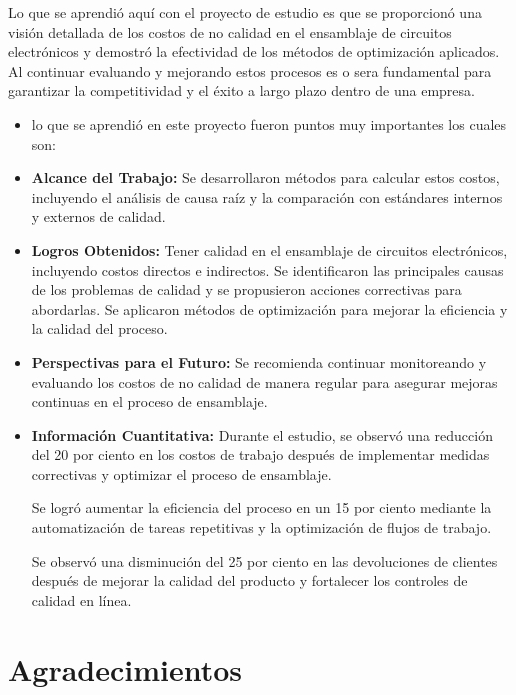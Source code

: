     Lo que se aprendió aquí con el proyecto de estudio es que se proporcionó una visión detallada de los costos de no calidad en el ensamblaje de circuitos electrónicos y demostró la efectividad de los métodos de optimización aplicados. Al continuar evaluando y mejorando estos procesos es o sera fundamental para garantizar la competitividad y el éxito a largo plazo dentro de una empresa.
    \begin{itemize}
    \item lo que se aprendió en este proyecto fueron puntos muy importantes los cuales son:
    
    \item \textbf{Alcance del Trabajo:}
    Se desarrollaron métodos para calcular estos costos, incluyendo el análisis de causa raíz y la comparación con estándares internos y externos de calidad.
    
    \item \textbf{Logros Obtenidos:} 
    Tener calidad en el ensamblaje de circuitos electrónicos, incluyendo costos directos e indirectos.
    Se identificaron las principales causas de los problemas de calidad y se propusieron acciones correctivas para abordarlas.
    Se aplicaron métodos de optimización para mejorar la eficiencia y la calidad del proceso.
    
    \item \textbf{Perspectivas para el Futuro:}
    Se recomienda continuar monitoreando y evaluando los costos de no calidad de manera regular para asegurar mejoras continuas en el proceso de ensamblaje.
    
    \item \textbf{Información Cuantitativa:}
    Durante el estudio, se observó una reducción del 20 por ciento en los costos de trabajo después de implementar medidas correctivas y optimizar el proceso de ensamblaje.
    
    Se logró aumentar la eficiencia del proceso en un 15 por ciento mediante la automatización de tareas repetitivas y la optimización de flujos de trabajo.
    
    Se observó una disminución del 25 por ciento en las devoluciones de clientes después de mejorar la calidad del producto y fortalecer los controles de calidad en línea.
    
    \end{itemize}
    
    \section{Agradecimientos}
    
